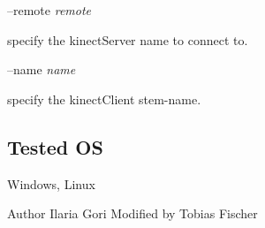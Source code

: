 --remote {\itshape remote} 
\begin{DoxyItemize}
\item specify the kinect\+Server name to connect to.
\end{DoxyItemize}

--name {\itshape name} 
\begin{DoxyItemize}
\item specify the kinect\+Client stem-\/name.
\end{DoxyItemize}\hypertarget{group__kinectServer_tested_os_sec}{}\subsection{Tested O\+S}\label{group__kinectServer_tested_os_sec}
Windows, Linux

\begin{DoxyAuthor}{Author}
Ilaria Gori Modified by Tobias Fischer 
\end{DoxyAuthor}
